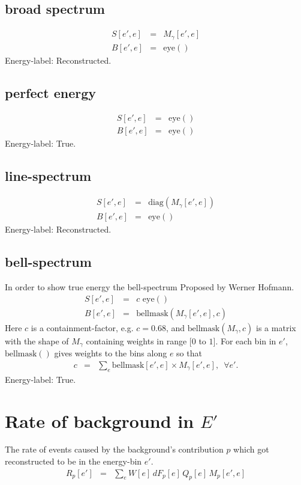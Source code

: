 \documentclass{article}%
\begin{document}
\subsection{broad spectrum}
\begin{eqnarray}
S[e', e] &=& M_{\gamma}[e',e]
\\
B[e', e] &=& \mathrm{eye}()
\end{eqnarray}
%
Energy-label: Reconstructed.
%
\subsection{perfect energy}
\begin{eqnarray}
S[e', e] &=& \mathrm{eye}()
\\
B[e', e] &=& \mathrm{eye}()
\end{eqnarray}
%
Energy-label: True.
%
\subsection{line-spectrum}
\begin{eqnarray}
S[e', e] &=& \mathrm{diag}(M_{\gamma}[e',e])
\\
B[e', e] &=& \mathrm{eye}()
\end{eqnarray}
%
Energy-label: Reconstructed.
%
\subsection{bell-spectrum}
%
In order to show true energy the bell-spectrum
%
Proposed by Werner Hofmann.
\begin{eqnarray}
S[e', e] &=& c \, \, \mathrm{eye}()
\\
B[e', e] &=& \mathrm{bellmask}(M_{\gamma}[e',e], c)
\end{eqnarray}
%
Here $c$ is a containment-factor, e.g. $c = 0.68$,
%
and $\mathrm{bellmask}(M_{\gamma}, c)$ is a matrix with the shape of $M_{\gamma}$ containing weights in range $[0$ to $1]$.
%
For each bin in $e'$, $\mathrm{bellmask}()$ gives weights to the bins along $e$ so that
%
\begin{eqnarray}
c &=& \sum_e \mathrm{bellmask}[e',e] \times M_{\gamma}[e', e], \, \, \, \forall e'.
\end{eqnarray}
%
Energy-label: True.
%
\section{Rate of background in $E'$}
%
The rate of events caused by the background's contribution $p$ which got reconstructed to be in the energy-bin $e'$.
%
\begin{eqnarray}
R_p[e'] &=& \sum_{e} W[e] \, dF_p[e] \, Q_p[e] \, M_p[e', e]
\end{eqnarray}
%
\end{document}
